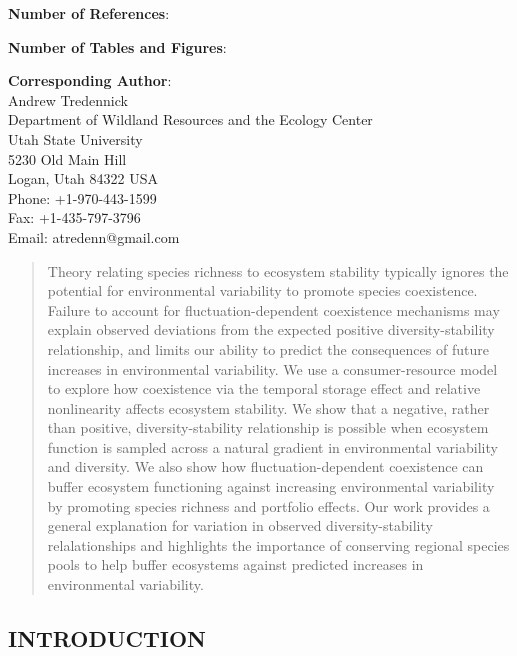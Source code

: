 \documentclass[12pt,]{article}
\begin{document}
\begin{singlespace}
\noindent \textbf{Number of References}:

\noindent \textbf{Number of Tables and Figures}:

\noindent \textbf{Corresponding Author}:  \\
Andrew Tredennick  \\
Department of Wildland Resources and the Ecology Center  \\
Utah State University  \\
5230 Old Main Hill  \\
Logan, Utah 84322 USA  \\
Phone: +1-970-443-1599  \\
Fax: +1-435-797-3796  \\
Email: atredenn@gmail.com

\end{singlespace}

\newpage{}

\begin{abstract}
Theory relating species richness to ecosystem stability typically ignores the potential for environmental variability to promote species coexistence.
Failure to account for fluctuation-dependent coexistence mechanisms may explain observed deviations from the expected positive diversity-stability relationship, and limits our ability to predict the consequences of future increases in environmental variability.
We use a consumer-resource model to explore how coexistence via the temporal storage effect and relative nonlinearity affects ecosystem stability.
We show that a negative, rather than positive, diversity-stability relationship is possible when ecosystem function is sampled across a natural gradient in environmental variability and diversity.
We also show how fluctuation-dependent coexistence can buffer ecosystem functioning against increasing environmental variability by promoting species richness and portfolio effects.
Our work provides a general explanation for variation in observed diversity-stability relalationships and highlights the importance of conserving regional species pools to help buffer ecosystems against predicted increases in environmental variability.
\vspace{2em}
\end{abstract}

\newpage{}

\setlength{\parindent}{5ex}

\subsection{INTRODUCTION}\label{introduction}
\end{document}
